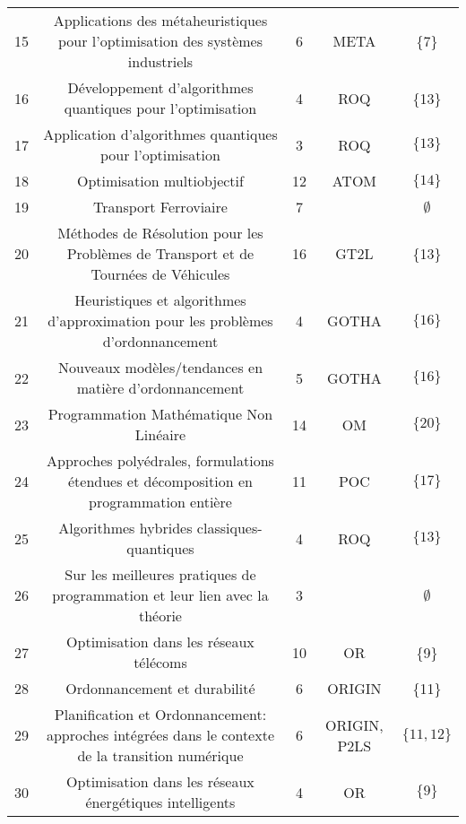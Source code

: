 \documentclass{article}
\begin{document}
\begin{center}
\begin{tabular}{ |c|c|c|c|c| }
 15 &Applications des métaheuristiques pour l'optimisation des systèmes industriels
 & 6 & META & \{7\}\\
 
 16 & Développement d'algorithmes quantiques pour l'optimisation 
 & 4 & ROQ & \{13\} \\

 17 & Application d'algorithmes quantiques pour l'optimisation 
 & 3 & ROQ & $\{13\}$\\ 
 
 18 & Optimisation multiobjectif  
 & 12 & ATOM & $\{14\}$ \\ 
 
 19 & Transport Ferroviaire & 7 & & $\emptyset$\\
 
 20 & Méthodes de Résolution pour les Problèmes de Transport et de Tournées de Véhicules 
 & 16 & GT2L & \{13\} \\

 21 & Heuristiques et algorithmes d'approximation pour les problèmes d'ordonnancement
 & 4 & GOTHA & $\{16\}$\\ 
 
 22 & Nouveaux modèles/tendances en matière d'ordonnancement
 & 5 & GOTHA & $\{16\}$ \\ 
 
 23 & Programmation Mathématique Non Linéaire 
 & 14 & OM & $\{20\}$\\ 
 
 24 & Approches polyédrales, formulations étendues et décomposition en programmation entière
 & 11 & POC & $\{17\}$ \\
 
 25 & Algorithmes hybrides classiques-quantiques
 & 4 & ROQ & $\{13\}$\\ 
 
 26 & Sur les meilleures pratiques de programmation et leur lien avec la théorie
 & 3 & & $\emptyset$ \\ 
 
 27 & Optimisation dans les réseaux télécoms
 & 10 & OR & \{9\}\\
 
 28 & Ordonnancement et durabilité
 & 6 & ORIGIN & \{11\} \\

 29 & Planification et Ordonnancement: approches intégrées dans le contexte de la transition numérique 
 & 6 & ORIGIN, P2LS & $\{11,12\}$\\ 
 
 30 & Optimisation dans les réseaux énergétiques intelligents 
 & 4 & OR & $\{9\}$ \\ 
 

\end{tabular}
\end{center}
\end{document}
